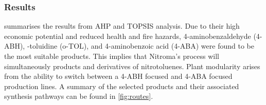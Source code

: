 


\subsubsection{Results}
 summarises the results from AHP and TOPSIS analysis.   
Due to their high economic potential and reduced health and fire hazards, 4-aminobenzaldehyde (4-ABH), \ortho-toluidine (o-TOL), and 4-aminobenzoic acid (4-ABA) were found to be the most suitable products. This implies that Nitroma's process will simultaneously products \ortho and \para derivatives of nitrotoluenes. Plant modularity arises from the ability to switch between a 4-ABH focused and 4-ABA focused production lines. A summary of the selected products and their associated synthesis pathways can be found in \cref{fig:routes}.

